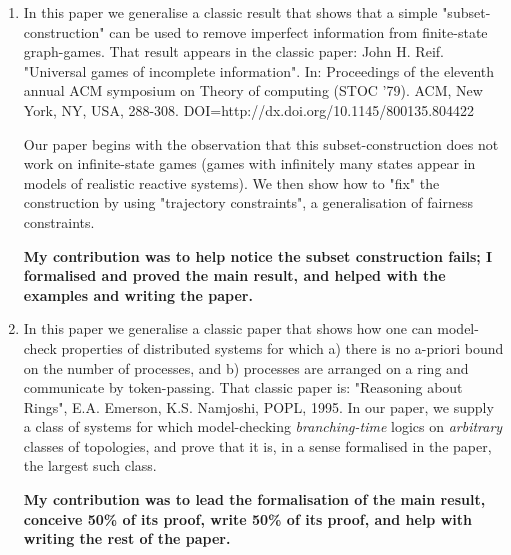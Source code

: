 \documentclass[a4paper,10pt]{scrartcl}
\begin{document}
\begin{enumerate}
\item {} In this paper we generalise a classic result that shows that a simple "subset-construction" can be used to remove imperfect information from finite-state graph-games. That result appears in the  classic paper:
John H. Reif. 
"Universal games of incomplete information". 
In: Proceedings of the eleventh annual ACM symposium on Theory of computing (STOC '79). 
ACM, New York, NY, USA, 288-308. 
DOI=http://dx.doi.org/10.1145/800135.804422

Our paper begins with the observation that this subset-construction does not work on infinite-state games (games with infinitely many states appear in models of realistic reactive systems). We then show how to "fix" the construction by using "trajectory constraints", a generalisation of fairness constraints.

\textbf{My contribution was to help notice the subset construction fails; I formalised and proved the main result, and helped with the examples and writing the paper.}

\item {} In this paper we generalise a classic paper that shows how one can model-check properties of distributed systems for which a) there is no a-priori bound on the number of processes, and b) processes are arranged on a ring and communicate by token-passing. That classic paper is: 
"Reasoning about Rings", E.A. Emerson, K.S. Namjoshi, POPL, 1995.
In our paper, we supply a class of systems for which model-checking \emph{branching-time} logics on \emph{arbitrary} classes of topologies, and prove that it is, in a sense formalised in the paper, the largest such class.

\textbf{My contribution was to lead the formalisation of the main result, conceive 50\% of its proof, write 50\% of its proof, and help with writing the rest of the paper.}

\end{enumerate}
\end{document}

